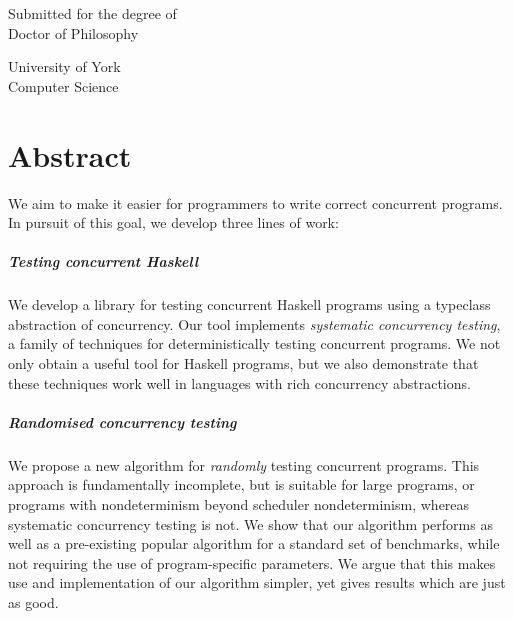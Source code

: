 \begin{titlepage}
  \begin{center}
    \makeatletter

    {\fontsize{28pt}{30pt}\selectfont \@title \par}

    \vspace{1.3cm}

    \Large

    \@author

    \vfill

    Submitted for the degree of\\
    Doctor of Philosophy

    \vspace{1cm}

    University of York\\
    Computer Science

    \vspace{1cm}

    \@date
    \makeatother
  \end{center}
\end{titlepage}

\chapter*{Abstract}

We aim to make it easier for programmers to write correct concurrent
programs.  In pursuit of this goal, we develop three lines of work:

\paragraph{Testing concurrent Haskell}
We develop a library for testing concurrent Haskell programs using a
typeclass abstraction of concurrency.  Our tool implements
\emph{systematic concurrency testing}, a family of techniques for
deterministically testing concurrent programs.  We not only obtain a
useful tool for Haskell programs, but we also demonstrate that these
techniques work well in languages with rich concurrency abstractions.

\paragraph{Randomised concurrency testing}
We propose a new algorithm for \emph{randomly} testing concurrent
programs.  This approach is fundamentally incomplete, but is suitable
for large programs, or programs with nondeterminism beyond scheduler
nondeterminism, whereas systematic concurrency testing is not.  We
show that our algorithm performs as well as a pre-existing popular
algorithm for a standard set of benchmarks, while not requiring the
use of program-specific parameters.  We argue that this makes use and
implementation of our algorithm simpler, yet gives results which are
just as good.

